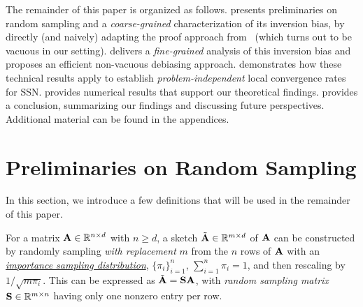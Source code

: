 \documentclass[11pt,a4paper]{article}
\begin{document}
The remainder of this paper is organized as follows.  
 presents preliminaries on random sampling and a \emph{coarse-grained} characterization of its inversion bias, by directly (and naively) adapting the proof approach from~\citet{derezinski2021sparse} (which turns out to be vacuous in our setting).
 delivers a \emph{fine-grained} analysis of this inversion bias and proposes an efficient non-vacuous debiasing approach.
 demonstrates how these technical results apply to establish \emph{problem-independent} local convergence rates for SSN.
 provides numerical results that support our theoretical findings.
 provides a conclusion, summarizing our findings and discussing future perspectives.
Additional material can be found in the appendices.



\section{Preliminaries on Random Sampling}
\label{sec:pre}

In this section, we introduce a few definitions that will be used in the remainder of this paper.
 
\begin{definition}\label{def:RS}
For a matrix $\mathbf{A} \in {\mathbb{R}}^{n \times d}$ with $n\geq d$, a sketch $\tilde {\mathbf{A}} \in {\mathbb{R}}^{m \times d}$ of $\mathbf{A}$ can be constructed by randomly sampling \emph{with replacement} $m$ from the $n$ rows of $\mathbf{A}$ with an \underline{\emph{importance sampling distribution}}, $\{\pi_i\}_{i=1}^n$, $\sum_{i=1}^n \pi_i = 1$, and then rescaling by $1/\sqrt{m \pi_i}$.
This can be expressed as $\tilde{\mathbf{A}}=\mathbf{S}\mathbf{A}$, with \emph{random sampling  matrix} $\mathbf{S}\in {\mathbb{R}}^{m\times n}$ having only one nonzero entry per row.
\end{definition}
\end{document}
